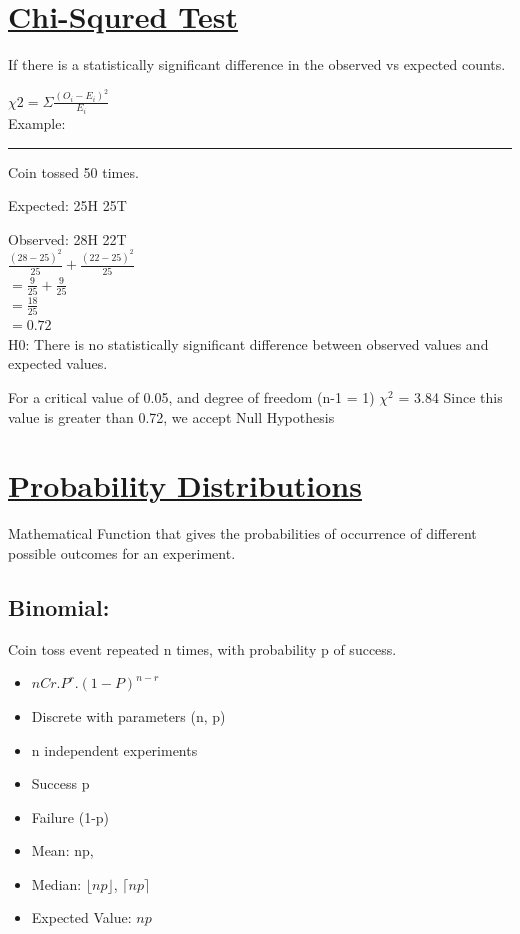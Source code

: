 \documentclass[11pt]{article}
\begin{document}
\section{\underline{Chi-Squred Test}}
\label{sec:org97b796d}

If there is a statistically significant difference in the observed vs expected counts.

\(\chi{2} = \Sigma\frac{(O_{i} - E_{i})^2}{E_{i}}\) \\


Example:

\noindent\rule{\textwidth}{0.5pt}
Coin tossed 50 times.

Expected: 25H 25T

Observed: 28H 22T \\


\(\frac{(28-25)^2}{25} +   \frac{(22-25)^2}{25}\) \\

\(= \frac{9}{25} + \frac{9}{25}\) \\

\(= \frac{18}{25}\) \\

\(= 0.72\) \\

H0: There is no statistically significant difference between observed values and expected values.

For a critical value of 0.05, and degree of freedom (n-1 = 1)   \(\chi^{2}\) = 3.84
Since this value is greater than 0.72, we accept Null Hypothesis


\section{\underline{Probability Distributions}}
\label{sec:org215f10e}

Mathematical Function that gives the probabilities of occurrence of different
possible outcomes for an experiment. \\

\subsection{Binomial:}
\label{sec:org5a6ce84}

Coin toss event repeated n times, with probability p of success. 

\begin{itemize}
\item \(nCr . P^{r} . (1 - P)^{n-r}\)
\item Discrete with parameters (n, p)
\item n independent experiments
\item Success p
\item Failure (1-p)
\item Mean: np,
\item Median: \(\lfloor np \rfloor\), \(\lceil np \rceil\)
\item Expected Value: \(np\)
\end{itemize}
\end{document}
